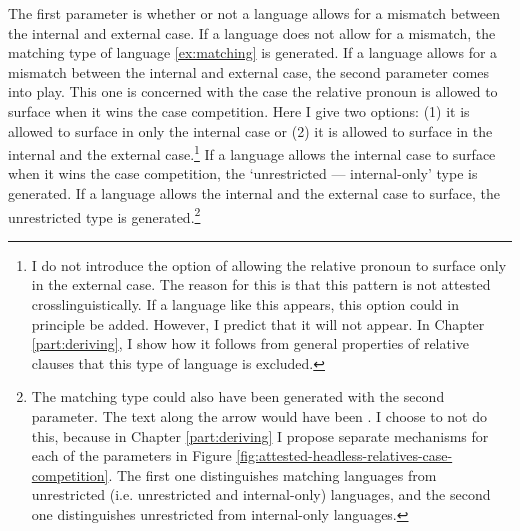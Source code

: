 The first parameter is whether or not a language allows for a mismatch between the internal and external case.
If a language does not allow for a mismatch, the matching type of language \ref{ex:matching} is generated.
If a language allows for a mismatch between the internal and external case, the second parameter comes into play. This one is concerned with the case the relative pronoun is allowed to surface when it wins the case competition. Here I give two options: (1) it is allowed to surface in only the internal case or (2) it is allowed to surface in the internal and the external case.\footnote{
I do not introduce the option of allowing the relative pronoun to surface only in the external case. The reason for this is that this pattern is not attested crosslinguistically. If a language like this appears, this option could in principle be added. However, I predict that it will not appear. In Chapter \ref{part:deriving}, I show how it follows from general properties of relative clauses that this type of language is excluded.
}
If a language allows the internal case to surface when it wins the case competition, the `unrestricted --- internal-only' type is generated.
If a language allows the internal and the external case to surface, the unrestricted type is generated.\footnote{
The matching type could also have been generated with the second parameter. The text along the arrow would have been . I choose to not do this, because in Chapter \ref{part:deriving} I propose separate mechanisms for each of the parameters in Figure \ref{fig:attested-headless-relatives-case-competition}. The first one distinguishes matching languages from unrestricted (i.e. unrestricted and internal-only) languages, and the second one distinguishes unrestricted from internal-only languages.
}

